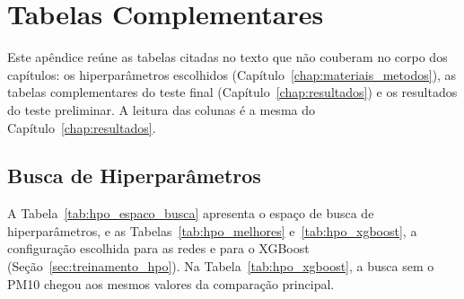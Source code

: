 \chapter{Tabelas Complementares}
\label{ap:teste_historico}

Este apêndice reúne as tabelas citadas no texto que não couberam no corpo dos capítulos: os hiperparâmetros escolhidos (Capítulo~\ref{chap:materiais_metodos}), as tabelas complementares do teste final (Capítulo~\ref{chap:resultados}) e os resultados do teste preliminar. A leitura das colunas é a mesma do Capítulo~\ref{chap:resultados}.

\section{Busca de Hiperparâmetros}

A Tabela~\ref{tab:hpo_espaco_busca} apresenta o espaço de busca de hiperparâmetros, e as Tabelas~\ref{tab:hpo_melhores} e~\ref{tab:hpo_xgboost}, a configuração escolhida para as redes e para o XGBoost (Seção~\ref{sec:treinamento_hpo}). Na Tabela~\ref{tab:hpo_xgboost}, a busca sem o PM10 chegou aos mesmos valores da comparação principal.

